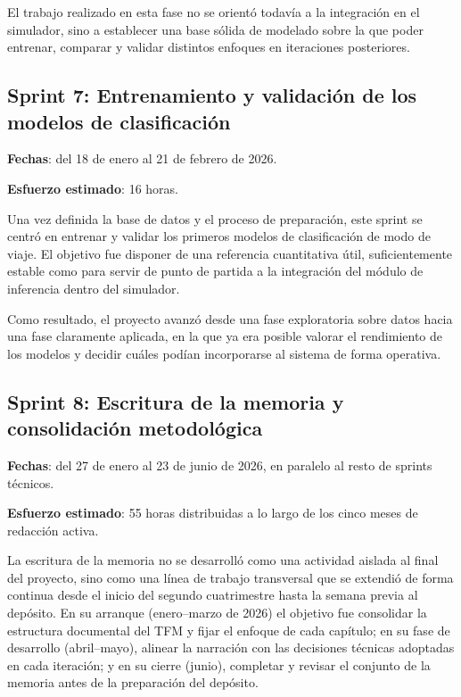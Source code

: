 El trabajo realizado en esta fase no se orientó todavía a la integración en el simulador, sino a establecer una base sólida de modelado sobre la que poder entrenar, comparar y validar distintos enfoques en iteraciones posteriores.

\subsection{Sprint 7: Entrenamiento y validación de los modelos de clasificación}

\textbf{Fechas}: del 18 de enero al 21 de febrero de 2026.

\textbf{Esfuerzo estimado}: 16 horas.\newline

Una vez definida la base de datos y el proceso de preparación, este sprint se centró en entrenar y validar los primeros modelos de clasificación de modo de viaje. El objetivo fue disponer de una referencia cuantitativa útil, suficientemente estable como para servir de punto de partida a la integración del módulo de inferencia dentro del simulador.\newline

Como resultado, el proyecto avanzó desde una fase exploratoria sobre datos hacia una fase claramente aplicada, en la que ya era posible valorar el rendimiento de los modelos y decidir cuáles podían incorporarse al sistema de forma operativa.\newline

\subsection{Sprint 8: Escritura de la memoria y consolidación metodológica}

\textbf{Fechas}: del 27 de enero al 23 de junio de 2026, en paralelo al resto de sprints técnicos.

\textbf{Esfuerzo estimado}: 55 horas distribuidas a lo largo de los cinco meses de redacción activa.\newline

La escritura de la memoria no se desarrolló como una actividad aislada al final del proyecto, sino como una línea de trabajo transversal que se extendió de forma continua desde el inicio del segundo cuatrimestre hasta la semana previa al depósito. En su arranque (enero--marzo de 2026) el objetivo fue consolidar la estructura documental del TFM y fijar el enfoque de cada capítulo; en su fase de desarrollo (abril--mayo), alinear la narración con las decisiones técnicas adoptadas en cada iteración; y en su cierre (junio), completar y revisar el conjunto de la memoria antes de la preparación del depósito.\newline


